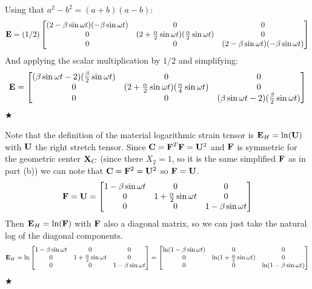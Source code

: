 Using that $a^2 - b^2 = (a+b)(a-b)$:
\begin{equation}
\mathbf{E} = (1/2)
\begin{bmatrix}
    (2 - \beta \sin{\omega t})(-\beta \sin{\omega t}) & 0 & 0 \\
    0 & (2 + \frac{\alpha}{2}\sin{\omega t})(\frac{\alpha}{2}\sin{\omega t})& 0\\
    0 & 0 & (2 - \beta \sin{\omega t})(-\beta \sin{\omega t})
\end{bmatrix}
\end{equation}
And applying the scalar multiplication by $1/2$ and simplifying:
\begin{equation}
\mathbf{E} =
\begin{bmatrix}
    (\beta \sin{\omega t}-2)(\frac{\beta}{2} \sin{\omega t}) & 0 & 0 \\
    0 & (2 + \frac{\alpha}{2}\sin{\omega t})(\frac{\alpha}{4}\sin{\omega t})& 0\\
    0 & 0 & (\beta \sin{\omega t}-2)(\frac{\beta}{2} \sin{\omega t})
\end{bmatrix}
\end{equation}
\hspace*{\fill} $\bigstar$

Note that the definition of the  material logarithmic strain tensor is $\mathbf{E}_H = \ln (\mathbf{U})$ with $\mathbf{U}$ the right stretch tensor. Since $\mathbf{C} = \mathbf{F}^T\mathbf{F} = \mathbf{U}^2$ and $\mathbf{F}$ is symmetric for the geometric center $\mathbf{X}_C$ (since there $X_2 = 1$, so it is the same simplified $\mathbf{F}$ as in part (b)) we can note that $\mathbf{C} = \mathbf{F}^2 = \mathbf{U}^2$ so $\mathbf{F} = \mathbf{U}$.
\begin{equation}
\mathbf{F} = \mathbf{U} =
\begin{bmatrix}
    1 - \beta \sin{\omega t} & 0 & 0 \\
    0 & 1 + \frac{\alpha}{2}\sin{\omega t} & 0\\
    0 & 0 & 1 - \beta \sin{\omega t}
\end{bmatrix}
\end{equation}
Then $\mathbf{E}_H = \ln (\mathbf{F})$ with $\mathbf{F}$ also a diagonal matrix, so we can just take the natural log of the diagonal components.
\begin{equation}
\mathbf{E}_H =\ln
\begin{bmatrix}
    1 - \beta \sin{\omega t} & 0 & 0 \\
    0 & 1 + \frac{\alpha}{2}\sin{\omega t} & 0\\
    0 & 0 & 1 - \beta \sin{\omega t}
\end{bmatrix} = 
\begin{bmatrix}
    \ln(1 - \beta \sin{\omega t}) & 0 & 0 \\
    0 & \ln(1 + \frac{\alpha}{2}\sin{\omega t}) & 0\\
    0 & 0 & \ln(1 - \beta \sin{\omega t})
\end{bmatrix}
\end{equation}
\hspace*{\fill} $\bigstar$

